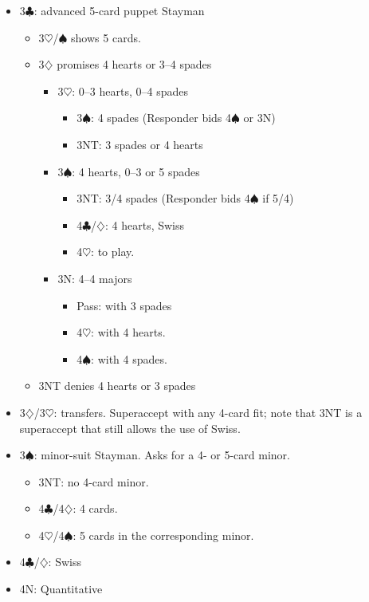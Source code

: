 \documentclass[a4paper,12pt]{article}
\begin{document}
\begin{itemize}
\item 3$\clubsuit$: advanced 5-card puppet Stayman
	\begin{itemize}
   \item 3$\heartsuit$/$\spadesuit$ shows 5 cards.
   \item 3$\diamondsuit$ promises 4 hearts or 3--4 spades
		\begin{itemize}
      \item 3$\heartsuit$: 0--3 hearts, 0--4 spades
			\begin{itemize}
         \item 3$\spadesuit$: 4 spades (Responder bids 4$\spadesuit$ or 3N)
         \item 3NT: 3 spades or 4 hearts
			\end{itemize}
      \item 3$\spadesuit$: 4 hearts, 0--3 or 5 spades
			\begin{itemize}
         \item 3NT: 3/4 spades (Responder bids 4$\spadesuit$ if 5/4)
         \item 4$\clubsuit$/$\diamondsuit$: 4 hearts, Swiss
         \item 4$\heartsuit$: to play.
			\end{itemize}
      \item 3N: 4--4 majors
			\begin{itemize}
			\item Pass: with 3 spades
         \item 4$\heartsuit$: with 4 hearts.
         \item 4$\spadesuit$: with 4 spades.
			\end{itemize}
		\end{itemize}
   \item 3NT denies 4 hearts or 3 spades
	\end{itemize}

\item 3$\diamondsuit$/3$\heartsuit$: transfers.  Superaccept with any 4-card fit; note that 3NT is a
superaccept that still allows the use of Swiss.

\item 3$\spadesuit$: minor-suit Stayman.  Asks for a 4- or 5-card minor.
	\begin{itemize}
   \item 3NT: no 4-card minor.
   \item 4$\clubsuit$/4$\diamondsuit$: 4 cards.
   \item 4$\heartsuit$/4$\spadesuit$: 5 cards in the corresponding minor.
	\end{itemize}

\item 4$\clubsuit$/$\diamondsuit$: Swiss
\item 4N: Quantitative
\end{itemize}
\end{document}
